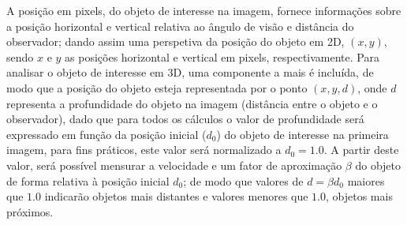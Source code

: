 A posição em pixels, do objeto de interesse na imagem, fornece informações 
sobre a posição horizontal e vertical relativa ao ângulo de visão e 
distância do observador; dando assim uma perspetiva 
da posição do objeto em 2D, $(x, y)$, sendo $x$ e $y$ as posições 
horizontal e vertical em pixels, respectivamente. Para analisar o objeto de interesse em 
3D, uma componente a mais é incluída, de modo que a posição do objeto esteja representada
por o ponto $(x, y, d)$, onde $d$ representa a profundidade 
do objeto na imagem (distância entre o objeto e o observador), 
dado que para todos os cálculos o valor de profundidade
será expressado em função da posição inicial ($d_0$) do objeto de interesse na primeira imagem,
para fins práticos, este valor será normalizado a $d_0=1.0$.
A partir
deste valor, será possível mensurar a velocidade e um fator de aproximação $\beta$ do objeto
de forma relativa à posição inicial $d_0$; de modo que valores de $d=\beta d_0$
maiores que $1.0$ indicarão objetos mais distantes e valores menores que $1.0$, objetos mais próximos.

